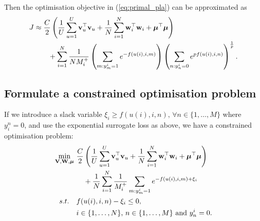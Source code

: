 Then the optimisation objective in (\ref{eq:primal_pla}) can be approximated as
\begin{equation*}
\begin{aligned}
J 
&\approx \frac{C}{2} \left( \frac{1}{U} \sum_{u=1}^U \mathbf{v}_u^\top \mathbf{v}_u + \frac{1}{N} \sum_{i=1}^N \mathbf{w}_i^\top \mathbf{w}_i + \bm{\mu}^\top \bm{\mu} \right) \\
& \hspace{2em}
  + \sum_{i=1}^N \frac{1}{N M_i^+} 
    \left( \sum_{m: y_m^i = 1} e^{-f(u(i), i, m)} \right)
    \left( \sum_{n: y_n^i = 0} e^{p f(u(i), i, n)} \right)^\frac{1}{p}.
\end{aligned}
\end{equation*}


\subsection{Formulate a constrained optimisation problem}
If we introduce a slack variable $\xi_i \ge f(u(i), i, n), \, \forall n \in \{1,\dots,M\}$ where $y_i^n = 0$,
and use the exponential surrogate loss as above, we have a constrained optimisation problem:
\begin{equation*}
\label{eq:primal_pla}
\begin{aligned}
\min_{\mathbf{V}, \mathbf{W}, \bm{\mu}} \ &
\frac{C}{2} \left( \frac{1}{U} \sum_{u=1}^U \mathbf{v}_u^\top \mathbf{v}_u 
     + \frac{1}{N} \sum_{i=1}^N \mathbf{w}_i^\top \mathbf{w}_i + \bm{\mu}^\top \bm{\mu} \right) \\
& \hspace{1em}
     + \frac{1}{N} \sum_{i=1}^N \frac{1}{M_i^+} \sum_{m: y_m^i = 1} e^{-f(u(i), i, m) + \xi_i} \\
s.t. \quad & 
f(u(i), i, n) - \xi_i \le 0, \\
& i \in \{1,\dots,N\}, \, n \in \{1,\dots,M\} \ \mathrm{and} \ y_n^i = 0.
\end{aligned}
\end{equation*}


